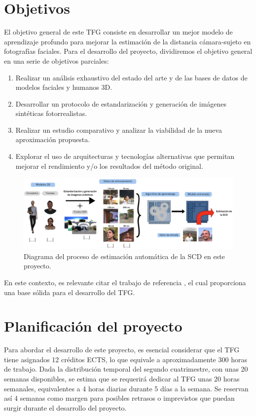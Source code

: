 \section{Objetivos}
 El objetivo general de este TFG consiste en desarrollar un mejor modelo de aprendizaje profundo para mejorar la estimación de la distancia cámara-sujeto en fotografías faciales. Para el desarrollo del proyecto, dividiremos el objetivo general en una serie de objetivos parciales:
\begin{enumerate}
    \item Realizar un análisis exhaustivo del estado del arte y de las bases de datos de modelos faciales y humanos 3D.
    \item Desarrollar un protocolo de estandarización y generación de imágenes sintéticas fotorrealistas.
    \item Realizar un estudio comparativo y analizar la viabilidad de la nueva aproximación propuesta.
    \item Explorar el uso de arquitecturas y tecnologías alternativas que permitan mejorar el rendimiento y/o los resultados del método original.
\end{enumerate}

\begin{figure}[h]
	\centering
	\includegraphics[scale=0.35]{imagenes/cap1/resumen.png}
	\caption[Diagrama del proyecto.]{Diagrama del proceso de estimación automática de la SCD en este proyecto.}
	\label{fig3}
\end{figure}

En este contexto, es relevante citar el trabajo de referencia \cite{14}, el cual proporciona una base sólida para el desarrollo del TFG.

\section{Planificación del proyecto}

Para abordar el desarrollo de este proyecto, es esencial considerar que el TFG tiene asignados 12 créditos ECTS, lo que equivale a aproximadamente 300 horas de trabajo. Dada la distribución temporal del segundo cuatrimestre, con unas 20 semanas disponibles, se estima que se requerirá dedicar al TFG unas 20 horas semanales, equivalentes a 4 horas diarias durante 5 días a la semana. Se reservan así 4 semanas como margen para posibles retrasos o imprevistos que puedan surgir durante el desarrollo del proyecto.


